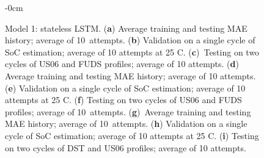 \begin{figure}[H]
\begin{adjustwidth}{-\extralength}{0cm}
\begin{subfigure}[b]{0.425\textwidth}
        \caption{\centering}
    \end{subfigure}
    \hfill
    \begin{subfigure}[b]{0.425\textwidth}
        \centering
        
        \caption{\centering}
    \end{subfigure}
    \end{adjustwidth}
    \caption{Model 1: stateless LSTM. (\textbf{a}) Average training and testing MAE history; average of 10~attempts. (\textbf{b}) Validation on a single cycle of SoC estimation; average of 10 attempts at 25 \textdegree{}C. (\textbf{c})~Testing on two cycles of US06 and FUDS profiles; average of 10 attempts. (\textbf{d}) Average training and testing MAE history; average of 10 attempts. (\textbf{e}) Validation on a single cycle of SoC estimation; average of 10 attempts at 25 \textdegree{}C. (\textbf{f}) Testing on two cycles of US06 and FUDS profiles; average of 10~attempts. (\textbf{g})~Average training and testing MAE history; average of 10~attempts. (\textbf{h}) Validation on a single cycle of SoC estimation; average of 10 attempts at 25 \textdegree{}C. (\textbf{i}) Testing on two cycles of DST and US06 profiles; average of 10 attempts.}
    \label{fig:Model-1res}
\end{figure}
\clearpage
